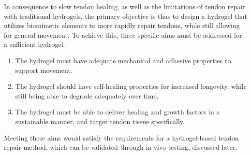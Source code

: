 In consequence to slow tendon healing, as well as the limitations of tendon repair with traditional hydrogels, the primary objective is thus to design a hydrogel that utilizes biomimetic elements to more rapidly repair tendons, while still allowing for general movement. To achieve this, three specific aims must be addressed for a sufficient hydrogel. 
\begin{enumerate}
\item The hydrogel must have adequate mechanical and adhesive properties to support movement.
\item The hydrogel should have self-healing properties for increased longevity, while still being able to degrade adequately over time.
\item The hydrogel must be able to deliver healing and growth factors in a sustainable manner, and target tendon tissue specifically.
\end{enumerate}
Meeting these aims would satisfy the requirements for a hydrogel-based tendon repair method, which can be validated through in-vivo testing, discussed later.
